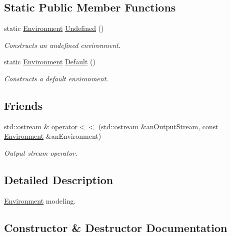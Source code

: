\subsection*{Static Public Member Functions}
\begin{DoxyCompactItemize}
\item 
static \hyperlink{classlibrary_1_1physics_1_1_environment}{Environment} \hyperlink{classlibrary_1_1physics_1_1_environment_a8d1dfff3867d59ecdebd3ee6e98a2dab}{Undefined} ()
\begin{DoxyCompactList}\small\item\em Constructs an undefined environment. \end{DoxyCompactList}\item 
static \hyperlink{classlibrary_1_1physics_1_1_environment}{Environment} \hyperlink{classlibrary_1_1physics_1_1_environment_a7fcc57999bfb9c0c7e70b7cc783e30c8}{Default} ()
\begin{DoxyCompactList}\small\item\em Constructs a default environment. \end{DoxyCompactList}\end{DoxyCompactItemize}
\subsection*{Friends}
\begin{DoxyCompactItemize}
\item 
std\+::ostream \& \hyperlink{classlibrary_1_1physics_1_1_environment_a7bc4b39898452fbe5ce3a8de75ad2596}{operator$<$$<$} (std\+::ostream \&an\+Output\+Stream, const \hyperlink{classlibrary_1_1physics_1_1_environment}{Environment} \&an\+Environment)
\begin{DoxyCompactList}\small\item\em Output stream operator. \end{DoxyCompactList}\end{DoxyCompactItemize}


\subsection{Detailed Description}
\hyperlink{classlibrary_1_1physics_1_1_environment}{Environment} modeling. 

\subsection{Constructor \& Destructor Documentation}
\mbox{\label{classlibrary_1_1physics_1_1_environment_a51854f130c31eb075ea623e332978495}} 
